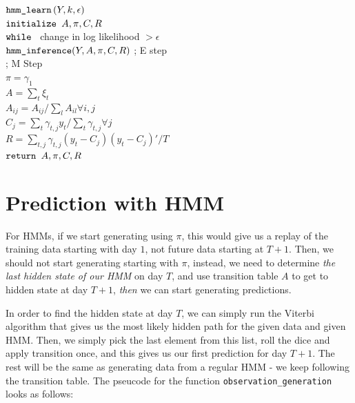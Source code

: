 \begin{algorithm}[h]
\begin{pseudocode}
\codename $\mbox{\texttt{hmm\_learn}}\left(Y,k,\epsilon \right)$\\
\codeline $\mbox{\texttt{initialize }} A, \pi, C, R$ \\
\codeline $\mbox{\texttt{while }}$ change in log likelihood $>\epsilon$ \\
\codeline \> $\mbox{\texttt{hmm\_inference}}(Y,A,\pi,C,R)$ ; E step \\
\codeline \> ; M Step\\
\codeline \> $\pi = \gamma_1$\\
\codeline \> $A = \sum_t \xi_t$\\
\codeline \> $A_{ij} = A_{ij} / \sum_l A_{il} \forall i,j$\\
\codeline \> $C_j = \sum_t \gamma_{t,j} y_t / \sum_t \gamma_{t,j} \forall j$\\
\codeline \> $R = \sum_{t,j} \gamma_{t,j} (y_t - C_j)(y_t - C_j)' / T$\\
\codeline $\mbox{\texttt{return }} A, \pi, C, R$
\end{pseudocode}
\end{algorithm}

\section{Prediction with HMM}

For HMMs, if we start generating using $\pi$, this would give us a replay of the
training data starting with day $1$, not future data starting at $T+1$. Then, we
should not start generating starting with $\pi$, instead, we need to determine
{\em the last hidden state of our HMM} on day $T$, and use transition table $A$
to get to hidden state at day $T+1$, {\em then} we can start generating predictions.

In order to find the hidden state at day $T$, we can simply run the Viterbi
algorithm that gives us the most likely hidden path for the given data and given
HMM. Then, we simply pick the last element from this list, roll the dice and
apply transition once, and this gives us our first prediction for day $T+1$. The
rest will be the same as generating data from a regular HMM - we keep following
the transition table. The pseucode for the function
\verb!observation_generation!  looks as follows:

